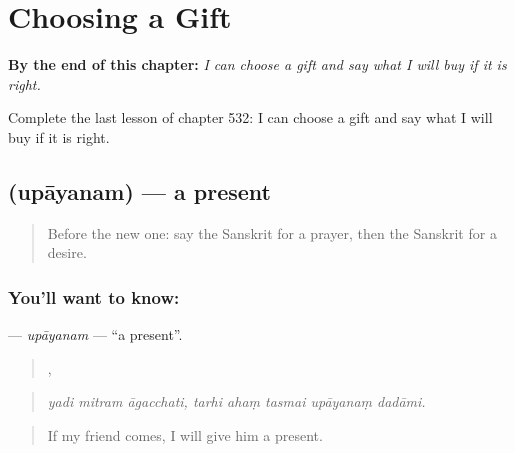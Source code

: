 
\chapter{Choosing a Gift}
\label{ch:sa-choosing-a-gift}

\begin{chapteropening}
\textbf{By the end of this chapter:} \emph{I can choose a gift and say what I will buy if it is right.}

Complete the last lesson of chapter 532: I can choose a gift and say what I will buy if it is right.
\end{chapteropening}

\section[\texorpdfstring{\sk{उपायनम्} (upāyanam)}{उपायनम् (upāyanam)}]{ (upāyanam) — a present}

\label{lesson:SA-C532-upayanam}



\begin{quote}
Before the new one: say the Sanskrit for a prayer, then the Sanskrit for a desire.
\end{quote}

\subsection*{You'll want to know: }
\textbf{} — \emph{upāyanam} — \textquotedblleft{}a present\textquotedblright{}.

\begin{quote}
  ,     
\end{quote}

\begin{quote}
\emph{yadi mitram āgacchati, tarhi ahaṃ tasmai upāyanaṃ dadāmi.}
\end{quote}

\begin{quote}
If my friend comes, I will give him a present.
\end{quote}

